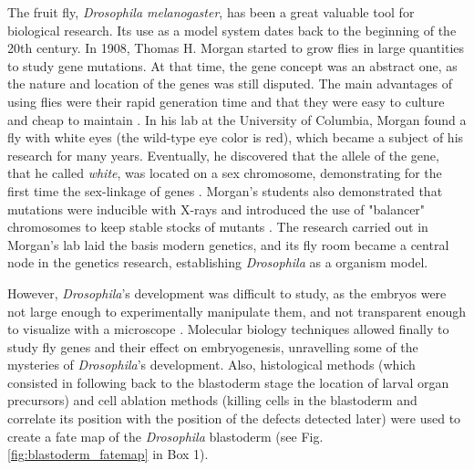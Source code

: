 The fruit fly, \textit{Drosophila melanogaster}, has been a great valuable tool for biological research.
Its use as a model system dates back to the beginning of the 20th century.
In 1908, Thomas H. Morgan started to grow flies in large quantities to study gene mutations. At that time, the gene concept was an abstract one, as the nature and location of the genes was still disputed.
%
The main advantages of using flies were their rapid generation time and that they were easy to culture and cheap to maintain \citep{Arias2008}.
%
In his lab at the University of Columbia, Morgan found a fly with white eyes (the wild-type eye color is red), which became a subject of his research for many years.
Eventually, he discovered that the allele of the gene, that he called \textit{white}, was located on a sex chromosome, demonstrating for the first time the sex-linkage of genes \citep{Morgan1919}.
%
Morgan's students also demonstrated that mutations were inducible with X-rays and introduced the use of "balancer" chromosomes to keep stable stocks of mutants \citep{Arias2008}.
%
The research carried out in Morgan's lab laid the basis modern genetics, and its fly room became a central node in the genetics research, establishing \textit{Drosophila} as a organism model.

However, \textit{Drosophila}'s development was difficult to study, as the embryos were not large enough to experimentally manipulate them, and not transparent enough to visualize with a microscope \citep{Gilbert2014}.
Molecular biology techniques allowed finally to study fly genes and their effect on embryogenesis, unravelling some of the mysteries of \textit{Drosophila}'s development.
Also, histological methods (which consisted in following back to the blastoderm stage the location of larval organ precursors) and cell ablation methods (killing cells in the blastoderm and correlate its position with the position of the defects detected later) were used to create a fate map of the \textit{Drosophila} blastoderm \citep{Campos-Ortega1985} (see Fig. \ref{fig:blastoderm_fatemap} in Box 1).

%

